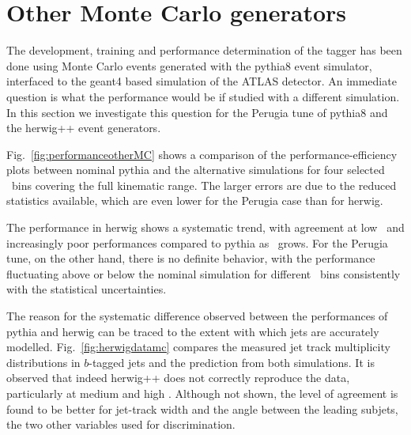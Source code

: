\section{Other Monte Carlo generators}\label{sec:otherMC}

The development, training and performance determination of the tagger has been done using Monte Carlo events generated with the {\sc pythia8} event simulator, interfaced to the {\sc geant4} based simulation of the ATLAS detector. An immediate question is what the performance would be if studied with a different simulation. In this section we investigate this question for the Perugia tune of {\sc pythia8} and the {\sc herwig++} event generators.

Fig.~\ref{fig:performanceotherMC} shows a comparison of the performance-efficiency plots between nominal {\sc pythia} and the alternative simulations for four selected \pt\ bins covering the full kinematic range. The larger errors are due to the reduced statistics available, which are even lower for the Perugia case than for {\sc herwig}.



The performance in {\sc herwig} shows a systematic trend, with agreement at low \pt\ and increasingly poor performances compared to {\sc pythia} as \pt\ grows. For the Perugia tune, on the other hand, there is no definite behavior, with the performance fluctuating above or below the nominal simulation for different \pt\ bins consistently with the statistical uncertainties.

The reason for the systematic difference observed between the performances of {\sc pythia} and {\sc herwig} can be traced to the extent with which jets are accurately modelled. Fig.~\ref{fig:herwigdatamc} compares the measured jet track multiplicity distributions in $b$-tagged jets and the prediction from both simulations. It is observed that indeed {\sc herwig++} does not correctly reproduce the data, particularly at medium and high \pt. Although not shown, the level of agreement is found to be better for jet-track width and the angle between the leading subjets, the two other variables used for discrimination.



